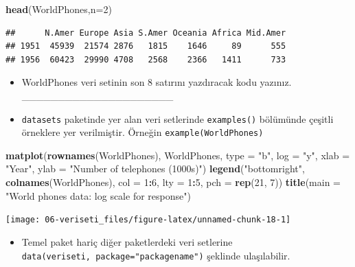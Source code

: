 \documentclass[
  oneside]{book}
\newenvironment{Shaded}{\begin{snugshade}}{\end{snugshade}}
\newcommand{\AttributeTok}[1]{\textcolor[rgb]{0.13,0.29,0.53}{#1}}
\newcommand{\DecValTok}[1]{\textcolor[rgb]{0.00,0.00,0.81}{#1}}
\newcommand{\FunctionTok}[1]{\textcolor[rgb]{0.13,0.29,0.53}{\textbf{#1}}}
\newcommand{\NormalTok}[1]{#1}
\newcommand{\SpecialCharTok}[1]{\textcolor[rgb]{0.81,0.36,0.00}{\textbf{#1}}}
\newcommand{\StringTok}[1]{\textcolor[rgb]{0.31,0.60,0.02}{#1}}
\providecommand{\tightlist}{%
  \setlength{\itemsep}{0pt}\setlength{\parskip}{0pt}}
\begin{document}
\begin{Shaded}
\begin{Highlighting}[]
\FunctionTok{head}\NormalTok{(WorldPhones,}\AttributeTok{n=}\DecValTok{2}\NormalTok{)}
\end{Highlighting}
\end{Shaded}

\begin{verbatim}
##      N.Amer Europe Asia S.Amer Oceania Africa Mid.Amer
## 1951  45939  21574 2876   1815    1646     89      555
## 1956  60423  29990 4708   2568    2366   1411      733
\end{verbatim}

\begin{itemize}
\item
  WorldPhones veri setinin son 8 satırını yazdıracak kodu yazınız. \_\_\_\_\_\_\_\_\_\_\_\_\_\_\_\_\_\_\_\_\_
\item
  \texttt{datasets} paketinde yer alan veri setlerinde \texttt{examples()} bölümünde çeşitli örneklere yer verilmiştir. Örneğin \texttt{example(WorldPhones)}
\end{itemize}

\begin{Shaded}
\begin{Highlighting}[]
\FunctionTok{matplot}\NormalTok{(}\FunctionTok{rownames}\NormalTok{(WorldPhones), WorldPhones, }\AttributeTok{type =} \StringTok{"b"}\NormalTok{, }\AttributeTok{log =} \StringTok{"y"}\NormalTok{,}
        \AttributeTok{xlab =} \StringTok{"Year"}\NormalTok{, }\AttributeTok{ylab =} \StringTok{"Number of telephones (1000\textquotesingle{}s)"}\NormalTok{)}
\FunctionTok{legend}\NormalTok{(}\StringTok{"bottomright"}\NormalTok{, }\FunctionTok{colnames}\NormalTok{(WorldPhones), }\AttributeTok{col =} \DecValTok{1}\SpecialCharTok{:}\DecValTok{6}\NormalTok{, }\AttributeTok{lty =} \DecValTok{1}\SpecialCharTok{:}\DecValTok{5}\NormalTok{,}
       \AttributeTok{pch =} \FunctionTok{rep}\NormalTok{(}\DecValTok{21}\NormalTok{, }\DecValTok{7}\NormalTok{))}
\FunctionTok{title}\NormalTok{(}\AttributeTok{main =} \StringTok{"World phones data: log scale for response"}\NormalTok{)}
\end{Highlighting}
\end{Shaded}

\begin{center}\texttt{[image: 06-veriseti\_files/figure-latex/unnamed-chunk-18-1]} \end{center}

\begin{itemize}
\tightlist
\item
  Temel paket hariç diğer paketlerdeki veri setlerine \texttt{data(veriseti,\ package="packagename")} şeklinde ulaşılabilir.
\end{itemize}
\end{document}
